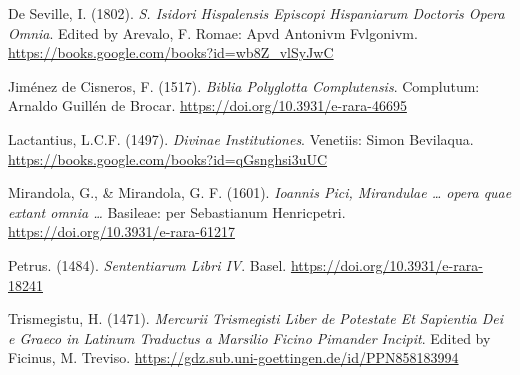 \documentclass[
]{article}
\begin{document}
De Seville, I. (1802). \emph{S. Isidori Hispalensis Episcopi Hispaniarum
Doctoris Opera Omnia}. Edited by Arevalo, F. Romae: Apvd Antonivm
Fvlgonivm. \url{https://books.google.com/books?id=wb8Z_vlSyJwC}

Jiménez de Cisneros, F. (1517). \emph{Biblia Polyglotta Complutensis}.
Complutum: Arnaldo Guillén de Brocar.
\url{https://doi.org/10.3931/e-rara-46695}

Lactantius, L.C.F. (1497). \emph{Divinae Institutiones}. Venetiis: Simon
Bevilaqua. \url{https://books.google.com/books?id=qGsnghsi3uUC}

Mirandola, G., \& Mirandola, G. F. (1601). \emph{Ioannis Pici,
Mirandulae \ldots{} opera quae extant omnia \ldots{}} Basileae: per
Sebastianum Henricpetri. \url{https://doi.org/10.3931/e-rara-61217}

Petrus. (1484). \emph{Sententiarum Libri IV}. Basel.
\url{https://doi.org/10.3931/e-rara-18241}

Trismegistu, H. (1471). \emph{Mercurii Trismegisti Liber de Potestate Et
Sapientia Dei e Graeco in Latinum Traductus a Marsilio Ficino Pimander
Incipit}. Edited by Ficinus, M. Treviso.
\url{https://gdz.sub.uni-goettingen.de/id/PPN858183994}
\end{document}
